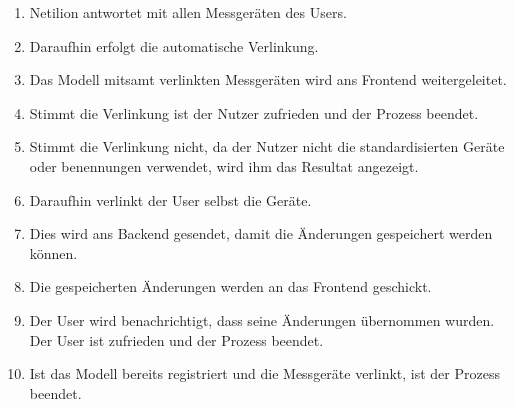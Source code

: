 \begin{enumerate}
  \item Netilion antwortet mit allen Messgeräten des Users.
  \item Daraufhin erfolgt die automatische Verlinkung.
  \item Das Modell mitsamt verlinkten Messgeräten wird ans Frontend weitergeleitet.
  \item Stimmt die Verlinkung ist der Nutzer zufrieden und der Prozess beendet.
  \item Stimmt die Verlinkung nicht, da der Nutzer nicht die standardisierten Geräte oder benennungen verwendet, wird ihm das Resultat angezeigt.
  \item Daraufhin verlinkt der User selbst die Geräte.
  \item Dies wird ans Backend gesendet, damit die Änderungen gespeichert werden können.
  \item Die gespeicherten Änderungen werden an das Frontend geschickt.
  \item Der User wird benachrichtigt, dass seine Änderungen übernommen wurden. Der User ist zufrieden und der Prozess beendet.
  \item Ist das Modell bereits registriert und die Messgeräte verlinkt, ist der Prozess beendet.
\end{enumerate}

